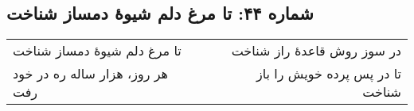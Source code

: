 \begin{center}
\section*{شماره ۴۴: تا مرغ دلم شیوۀ دمساز شناخت}
\label{sec:044}
\begin{longtable}{l p{0.5cm} r}
تا مرغ دلم شیوهٔ دمساز شناخت
&&
در سوز روش قاعدهٔ راز شناخت
\\
هر روز، هزار ساله ره در خود رفت
&&
تا در پس پرده خویش را باز شناخت
\\
\end{longtable}
\end{center}

